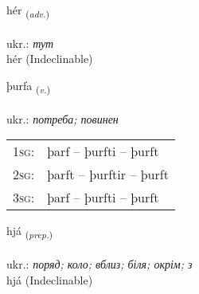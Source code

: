\documentclass[frontgrid, backgrid]{flacards}\usepackage[]{graphicx}\usepackage[]{xcolor}
\begin{document}
{hér \small{\textsubscript{(\textit{adv.})}} \\[1ex]
\textphonetic{[çɛːr]} \\
ukr.: \emph{тут} \\  [2ex]
hér (Indeclinable)}

\renewcommand{\flhead}{\vskip5pt \fboxsep=0pt {\small\bfseries\footnotesize Sagnorð | дієслово}}
\renewcommand{\fcfoot}{\vskip5pt \fboxsep=0pt \hspace{2pt}{\small\bfseries\footnotesize 1K}}

\renewcommand{\blhead}{\vskip5pt {\small\bfseries\footnotesize Sagnorð | дієслово }}
\renewcommand{\bcfoot}{\vskip5pt \hspace{2pt}{\small\bfseries\footnotesize 1K}}


{þurfa \small{\textsubscript{(\textit{v.})}} \\[1ex] %
\textphonetic{[θʏrva]} \\
ukr.: \emph{потреба; повинен} \\  [2ex]
\renewcommand*{\arraystretch}{0.8}
\begin{tabular}{p{1cm}l}
\textsc{1sg}: & þarf -- þurfti -- þurft \\ 
\textsc{2sg}: & þarft -- þurftir -- þurft \\ 
\textsc{3sg}: & þarf -- þurfti -- þurft \\ 
\end{tabular}
}


\renewcommand{\flhead}{\vskip5pt \fboxsep=0pt {\small\bfseries\footnotesize Forsetning | прийменник}}
\renewcommand{\fcfoot}{\vskip5pt \fboxsep=0pt \hspace{2pt}{\small\bfseries\footnotesize 1K}}

\renewcommand{\blhead}{\vskip5pt {\small\bfseries\footnotesize Forsetning | прийменник }}
\renewcommand{\bcfoot}{\vskip5pt \hspace{2pt}{\small\bfseries\footnotesize 1K}}


{hjá \small{\textsubscript{(\textit{prep.})}} \\[1ex]
\textphonetic{[çauː]} \\
ukr.: \emph{поряд; коло; вблиз; біля; окрім; з} \\  [2ex]
hjá (Indeclinable)}
\end{document}
